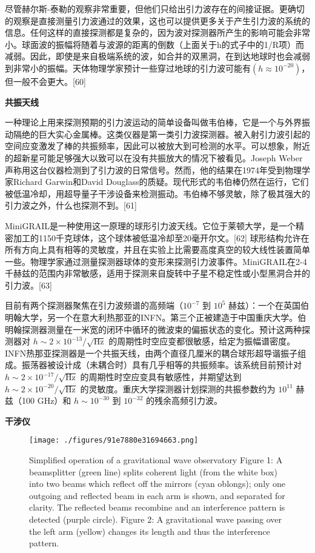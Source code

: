 尽管赫尔斯-泰勒的观察非常重要，但他们只给出引力波存在的间接证据。更确切的观察是直接测量引力波通过的效果，这也可以提供更多关于产生引力波的系统的信息。任何这样的直接探测都是复杂的，因为波对探测器所产生的影响可能会非常小。球面波的振幅将随着与波源的距离的倒数（上面关于h的式子中的1/R项）而减弱。因此，即使是来自极端系统的波，如合并的双黑洞，在到达地球时也会减弱到非常小的振幅。天体物理学家预计一些穿过地球的引力波可能有$(h \approx 10^{-20})$，但一般不会更大。[60]

\textbf{共振天线}

一种理论上用来探测预期的引力波运动的简单设备叫做韦伯棒，它是一个与外界振动隔绝的巨大实心金属棒。这类仪器是第一类引力波探测器。被入射引力波引起的空间应变激发了棒的共振频率，因此可以被放大到可检测的水平。可以想象，附近的超新星可能足够强大以致可以在没有共振放大的情况下被看见。Joseph Weber声称用这台仪器检测到了引力波的日常信号。然而，他的结果在1974年受到物理学家Richard Garwin和David Douglass的质疑。现代形式的韦伯棒仍然在运行，它们被低温冷却，用超导量子干涉设备来检测振动。韦伯棒不够灵敏，除了极其强大的引力波之外，什么也探测不到。[61]

MiniGRAIL是一种使用这一原理的球形引力波天线。它位于莱顿大学，是一个精密加工的1150千克球体，这个球体被低温冷却至20毫开尔文。[62] 球形结构允许在所有方向上具有相等的灵敏度，并且在实验上比需要高度真空的较大线性装置简单一些。物理学家通过测量探测器球体的变形来探测引力波事件。MiniGRAIL在2-4千赫兹的范围内非常敏感，适用于探测来自旋转中子星不稳定性或小型黑洞合并的引力波。[63]

目前有两个探测器聚焦在引力波频谱的高频端（$10^{-7}$ 到 $10^5$ 赫兹）：一个在英国伯明翰大学，另一个在意大利热那亚的INFN。第三个正被建造于中国重庆大学。伯明翰探测器测量在一米宽的闭环中循环的微波束的偏振状态的变化。预计这两种探测器对 $h \sim 2\times 10^{-13} /\sqrt{\text{Hz}}$ 的周期性时空应变都很敏感，给定为振幅谱密度。INFN热那亚探测器是一个共振天线，由两个直径几厘米的耦合球形超导谐振子组成。振荡器被设计成（未耦合时）具有几乎相等的共振频率。该系统目前预计对 $h \sim 2 \times 10^{-17} /\sqrt{\text{Hz}}$ 的周期性时空应变具有敏感性，并期望达到 $h \sim 2 \times 10^{-20} /\sqrt{\text{Hz}}$ 的灵敏度。重庆大学探测器计划探测的共振参数约为 $10^{11}$ 赫兹（100 GHz）和 $h \sim 10^{-30}$ 到 $10^{-32}$ 的残余高频引力波。

\textbf{干涉仪}

\begin{figure}[ht]
\centering
\texttt{[image: ./figures/91e7880e31694663.png]}
\caption{Simplified operation of a gravitational wave observatory Figure 1: A beamsplitter (green line) splits coherent light (from the white box) into two beams which reflect off the mirrors (cyan oblongs); only one outgoing and reflected beam in each arm is shown, and separated for clarity. The reflected beams recombine and an interference pattern is detected (purple circle). Figure 2: A gravitational wave passing over the left arm (yellow) changes its length and thus the interference pattern.} \label{fig_YLB_11}
\end{figure}

